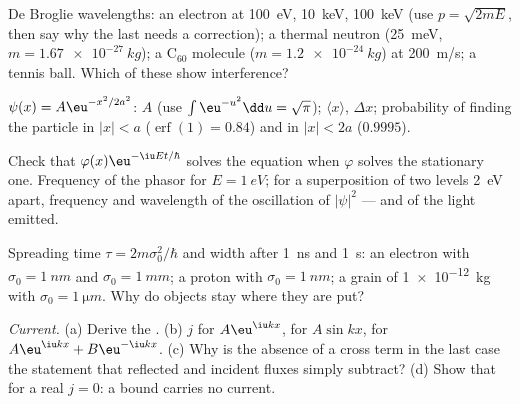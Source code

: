 \begin{exercise}[$\star$]\label{exo:b2:schrodinger-wave-functions:1}
De Broglie wavelengths: an electron at \qty{100}{eV}, \qty{10}{keV},
\qty{100}{keV} (use $p = \sqrt{2mE}$, then say why the last needs a
correction); a thermal neutron (\qty{25}{meV}, $m = \qty{1.67e-27}{kg}$); a
C$_{60}$ molecule ($m = \qty{1.2e-24}{kg}$) at \qty{200}{m/s}; a tennis
ball. Which of these show interference?
\end{exercise}

\begin{exercise}[$\star$]\label{exo:b2:schrodinger-wave-functions:2}
$\psi(x) = A\eu^{-x^2/2a^2}$: $A$ (use $\int\eu^{-u^2}\dd u = \sqrt\pi$);
$\langle x\rangle$, $\Delta x$; probability of finding the particle in
$|x| < a$ ($\operatorname{erf}(1) = 0.84$) and in $|x| < 2a$ ($0.9995$).
\end{exercise}

\begin{exercise}[$\star$]\label{exo:b2:schrodinger-wave-functions:3}
Check that $\varphi(x)\eu^{-\iu Et/\hbar}$ solves the equation when $\varphi$
solves the stationary one. Frequency of the phasor for $E = \qty{1}{eV}$;
for a superposition of two levels \qty{2}{eV} apart, frequency and
wavelength of the oscillation of $|\psi|^2$ --- and of the light
emitted.
\end{exercise}

\begin{exercise}[$\star$]\label{exo:b2:schrodinger-wave-functions:4}
Spreading time $\tau = 2m\sigma_0^2/\hbar$ and width after \qty{1}{ns} and
\qty{1}{s}: an electron with $\sigma_0 = \qty{1}{nm}$ and $\sigma_0 = \qty{1}{mm}$;
a proton with $\sigma_0 = \qty{1}{nm}$; a grain of \qty{1e-12}{kg} with
$\sigma_0 = \qty{1}{\micro m}$. Why do objects stay where they are put?
\end{exercise}

\begin{exercise}[$\star\star$]\label{exo:b2:schrodinger-wave-functions:5}
\emph{Current.} (a) Derive the . (b) $j$ for
$A\eu^{\iu kx}$, for $A\sin kx$, for $A\eu^{\iu kx} + B\eu^{-\iu kx}$. (c) Why is
the absence of a cross term in the last case the statement that
reflected and incident fluxes simply subtract? (d) Show that for a real
 $j = 0$: a bound  carries no current.
\end{exercise}

